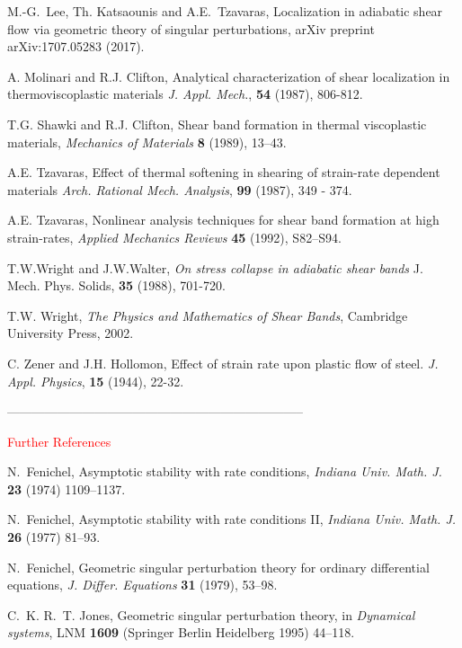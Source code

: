\documentclass[a4paper,11pt]{article}
\newcommand{\tcr}{\textcolor{red}}
\theoremstyle{remark}
\begin{document}
\begin{thebibliography}{10}
{\sc M.-G.~Lee, Th. Katsaounis and A.E.~Tzavaras},
Localization in adiabatic shear flow via geometric theory of singular perturbations,
arXiv preprint arXiv:1707.05283 (2017).


{\sc A. Molinari and R.J. Clifton},
{ Analytical characterization of shear localization in thermoviscoplastic materials}
 {\it J. Appl. Mech.},  {\bf 54} (1987), 806-812.
 
{\sc T.G. Shawki and R.J. Clifton},
Shear band formation in thermal viscoplastic materials,
{\it Mechanics of Materials}
{\bf 8 } (1989), 13--43.

{\sc A.E. Tzavaras},
{Effect of thermal softening in shearing of strain-rate dependent materials}
{\it Arch. Rational Mech. Analysis}, {\bf 99} (1987), 349 - 374.

{\sc A.E. Tzavaras},
Nonlinear analysis techniques for shear band formation at high strain-rates,
 {\it Applied Mechanics Reviews}
{\bf  45} (1992), S82--S94.

{\sc T.W.Wright and J.W.Walter},
{\sl On stress collapse in adiabatic shear bands}
J. Mech. Phys. Solids, {\bf 35} (1988), 701-720.

{\sc T.W. Wright},
{\sl The Physics and Mathematics of Shear Bands},
Cambridge University Press, 2002.


{\sc  C. Zener and J.H. Hollomon},
{ Effect of strain rate upon plastic flow of steel.}
{\it J. Appl. Physics}, {\bf 15} (1944), 22-32.



-----------------------------------------------------------------------

\tcr{ Further References }



{\sc N.~Fenichel},
Asymptotic stability with rate conditions,
{\it Indiana Univ. Math. J.} {\bf 23} (1974) 1109--1137.

{\sc N.~Fenichel},
Asymptotic stability with rate conditions \textrm{II},
{\it Indiana Univ. Math. J.} {\bf 26} (1977) 81--93.

{\sc N.~Fenichel},
Geometric singular perturbation theory for ordinary differential equations,
{\it J. Differ. Equations} {\bf 31} (1979), 53--98.

 {\sc C.~K. R.~T. Jones},
 Geometric singular perturbation theory, in {\it Dynamical systems}, LNM {\bf 1609} (Springer Berlin Heidelberg 1995) 44--118.


\end{thebibliography}
\end{document}
